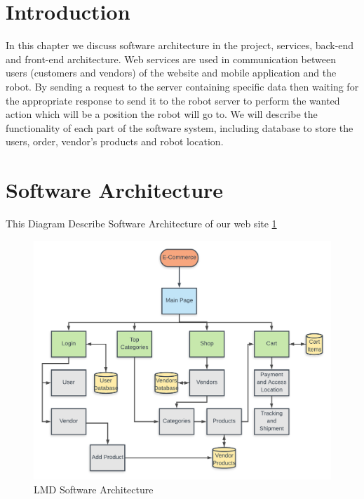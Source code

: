 \newline
\newline
\vspace{3mm}
\hfill

\section{Introduction}

\hspace{2cm}In this chapter we discuss software architecture in the project, services, back-end and front-end architecture.
Web services are used in communication between users (customers and vendors) of the website and mobile application and the robot.
By sending a request to the server containing specific data then waiting for the appropriate response to send it to the robot server to perform the wanted action which will be a position the robot will go to.
We will describe the functionality of each part of the software system, including database to store the users, order, vendor’s products and robot location.


\section{Software Architecture}
\hspace{2cm}This Diagram Describe Software Architecture of our web site \ref{fig: LMD}
\begin{figure}%
    \center%
    \includegraphics[width=1\textwidth]{images/Software/frontend.png}%
    \caption[LMD Software Architecture]{LMD Software Architecture}\label{fig: LMD}%
  \end{figure}

